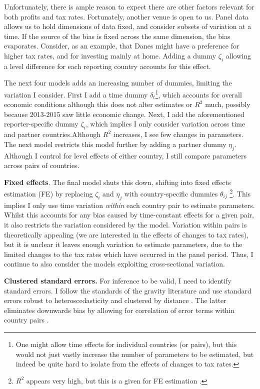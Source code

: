 \documentclass[twoside,a4paper,11pt]{article}
\begin{document}
Unfortunately, there is ample reason to expect there are other factors relevant for both profits and tax rates. Fortunately, another venue is open to us.  Panel data allows us to hold dimensions of data fixed, and consider subsets of variation at a time. If the source of the bias is fixed across the same dimension, the bias evaporates. Consider, as an example, that Danes might have a preference for higher tax rates, and for investing mainly at home.  Adding a dummy $ \zeta_i $ allowing a level difference for each reporting country accounts for this effect. 

The next four models adds an increasing number of dummies, limiting the variation I consider. First I add a time dummy $ \delta_t $\footnote{One might allow time effects for individual countries (or pairs), but this would not just vastly increase the number of parameters to be estimated, but indeed be quite hard to isolate from the effects of changes to tax rates.}, which accounts for overall economic conditions although this does not alter estimates or $ R^2 $ much, possibly because 2013-2015 saw little economic change. Next, I add the aforementioned reporter-specific dummy $ \zeta_i $, which implies I only consider variation across time and partner countries.Although $ R^2 $ increases, I see few changes in parameters.  The next model restricts this model further by adding a partner dummy $ \eta_j $. Although I control for level effects of either country, I still compare parameters across pairs of countries.  

\textbf{Fixed effects}. The final model shuts this down, shifting into fixed effects estimation (FE)  by replacing $ \zeta_i $ and $ \eta_j $ with country-specific dummies $ \theta_{ij} $ \autocite[479]{wooldridge_introductory_2009}\footnote{$R^2$ appears very high, but this is a given for FE estimation \autocite[471]{wooldridge_introductory_2009}.}. This implies I only use time variation \textit{within} each country pair to estimate parameters. Whilst this accounts for any bias caused by time-constant effects for a given pair, it also restricts the variation considered by the model. Variation within pairs is theoretically appealing (we are interested in the effects of changes to tax rates), but it is unclear it leaves enough variation to estimate parameters, due to the limited changes to the tax rates which have occurred in the panel period. Thus, I continue to also consider the models exploiting cross-sectional variation. 

\textbf{Clustered standard errors.} For inference to be valid, I need to identify standard errors. I follow the standards of the gravity literature and use standard errors robust to heteroscedasticity and clustered by distance \autocite[28]{shepherd_gravity_2012}. The latter eliminates downwards bias by allowing for  correlation of error terms within country pairs \autocite[312]{angrist_mostly_2009}.
\end{document}
